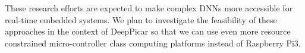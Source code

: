 These research efforts are expected to make complex DNNs more
accessible for real-time embedded systems. We plan to investigate the
feasibility of these approaches in the context of DeepPicar so that we
can use even more resource constrained micro-controller class
computing platforms instead of Raspberry Pi3.

  

